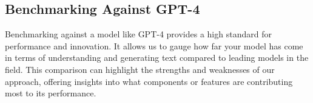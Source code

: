 \subsection{Benchmarking Against GPT-4}
\label{subsec:4_benchmarking_against_gpt-4}
Benchmarking against a model like GPT-4 provides a high standard for performance and innovation. It allows us to gauge how far your model has come in terms of understanding and generating text compared to leading models in the field. This comparison can highlight the strengths and weaknesses of our approach, offering insights into what components or features are contributing most to its performance. 